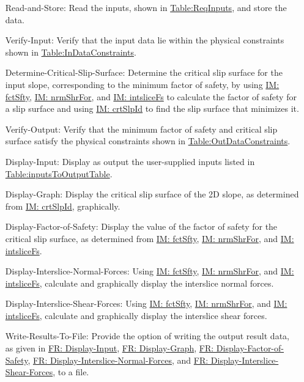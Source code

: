 \documentclass[12pt]{article}
\begin{document}
\begin{itemize}
\item[Read-and-Store:\phantomsection\label{readAndStore}]Read the inputs, shown in \hyperref[Table:ReqInputs]{Table:ReqInputs}, and store the data.
\item[Verify-Input:\phantomsection\label{verifyInput}]Verify that the input data lie within the physical constraints shown in \hyperref[Table:InDataConstraints]{Table:InDataConstraints}.
\item[Determine-Critical-Slip-Surface:\phantomsection\label{determineCritSlip}]Determine the critical slip surface for the input slope, corresponding to the minimum factor of safety, by using \hyperref[IM:fctSfty]{IM: fctSfty}, \hyperref[IM:nrmShrFor]{IM: nrmShrFor}, and \hyperref[IM:intsliceFs]{IM: intsliceFs} to calculate the factor of safety for a slip surface and using \hyperref[IM:crtSlpId]{IM: crtSlpId} to find the slip surface that minimizes it.
\item[Verify-Output:\phantomsection\label{verifyOutput}]Verify that the minimum factor of safety and critical slip surface satisfy the physical constraints shown in \hyperref[Table:OutDataConstraints]{Table:OutDataConstraints}.
\item[Display-Input:\phantomsection\label{displayInput}]Display as output the user-supplied inputs listed in \hyperref[Table:inputsToOutputTable]{Table:inputsToOutputTable}.
\item[Display-Graph:\phantomsection\label{displayGraph}]Display the critical slip surface of the 2D slope, as determined from \hyperref[IM:crtSlpId]{IM: crtSlpId}, graphically.
\item[Display-Factor-of-Safety:\phantomsection\label{displayFS}]Display the value of the factor of safety for the critical slip surface, as determined from \hyperref[IM:fctSfty]{IM: fctSfty}, \hyperref[IM:nrmShrFor]{IM: nrmShrFor}, and \hyperref[IM:intsliceFs]{IM: intsliceFs}.
\item[Display-Interslice-Normal-Forces:\phantomsection\label{displayNormal}]Using \hyperref[IM:fctSfty]{IM: fctSfty}, \hyperref[IM:nrmShrFor]{IM: nrmShrFor}, and \hyperref[IM:intsliceFs]{IM: intsliceFs}, calculate and graphically display the interslice normal forces.
\item[Display-Interslice-Shear-Forces:\phantomsection\label{displayShear}]Using \hyperref[IM:fctSfty]{IM: fctSfty}, \hyperref[IM:nrmShrFor]{IM: nrmShrFor}, and \hyperref[IM:intsliceFs]{IM: intsliceFs}, calculate and graphically display the interslice shear forces.
\item[Write-Results-To-File:\phantomsection\label{writeToFile}]Provide the option of writing the output result data, as given in \hyperref[displayInput]{FR: Display-Input}, \hyperref[displayGraph]{FR: Display-Graph}, \hyperref[displayFS]{FR: Display-Factor-of-Safety}, \hyperref[displayNormal]{FR: Display-Interslice-Normal-Forces}, and \hyperref[displayShear]{FR: Display-Interslice-Shear-Forces}, to a file.
\end{itemize}
\end{document}
